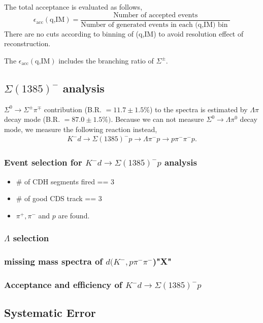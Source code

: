 The total acceptance is evaluated as follows,
\[
\epsilon_{\mbox{acc}}(\mbox{q,IM}) = \frac{\mbox{Number of accepted events}}{\mbox{Number of generated events in each (q,IM) bin }}
\]
There are no cuts according to binning of (q,IM) to avoid resolution effect of reconstruction.

The $\epsilon_{\mbox{acc}}(\mbox{q,IM})$ includes the branching ratio of $\Sigma^{\pm}$. 



\subsection{$\Sigma(1385)^{-}$ analysis}
$\Sigma^0 \rightarrow \Sigma^\pm\pi^\mp$ contribution (B.R. $=11.7 \pm 1.5 \%$) to the spectra is estimated by $\Lambda \pi$ decay mode (B.R. $=87.0 \pm 1.5 \%)$.
Because we can not measure $\Sigma^0 \rightarrow \Lambda \pi^0$ decay mode, we measure the following reaction instead,
\begin{eqnarray}
 K^-d \rightarrow \Sigma(1385)^-p \rightarrow \Lambda \pi^- p \rightarrow p\pi^-\pi^-p.
\end{eqnarray}
\subsubsection{Event selection for $K^-d \rightarrow \Sigma(1385)^-p$ analysis}
\begin{itemize}
\item \# of CDH segments fired == 3
\item \# of good CDS track == 3
\item $\pi^+,\pi^-$ and $p$ are found.
\end{itemize}

\subsubsection{$\Lambda$ selection}

\subsubsection{missing mass spectra of $d(K^-,p\pi^-\pi^-$)"X"}

\subsubsection{Acceptance and efficiency of $K^-d \rightarrow \Sigma(1385)^-p$}


\subsection{Systematic Error}



